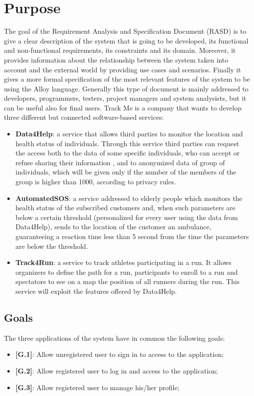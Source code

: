 \section{Purpose}
The  goal of the Requirement Analysis and Specification Document (RASD) is to give a clear description of the system that is going to be developed, its functional and non-functional requirements, its constraints and its domain. Moreover, it provides information about the relationship between the system taken into account and the external world by providing use cases and scenarios. Finally it gives a more formal specification of the most relevant features of the system to be using the Alloy language.
Generally this type of document is mainly addressed to developers, programmers, testers, project managers and system analysists, but it can be useful also for final users.
Track Me is a company that wants to develop three different but connected software-based services:
\begin{itemize}
  \item \textbf{Data4Help}: a service that allows third parties to monitor the location and health status of individuals. Through this service third parties can request the access both to the data of some specific individuals, who can accept or refuse sharing their information , and to anonymized data of group of individuals, which will be given only if the number of the members of the group is higher than 1000, according to privacy rules.
  \item \textbf{AutomatedSOS}: a service addressed to elderly people which monitors the health status of the subscribed customers and, when such parameters are below a certain threshold (personalized for every user using the data from Data4Help), sends to the location of the customer an ambulance, guaranteeing a reaction time less than 5 second from the time the parameters are below the threshold.
  \item \textbf{Track4Run}: a service to track athletes participating in a run. It allows organizers to define the path for a run, participants to enroll to a run and spectators to see on a map the position of all runners during the run. This service will exploit the features offered by Data4Help.
\end{itemize}

\subsection{Goals}
The three applications of the system have in common the following goals:
\begin{itemize}
  \item \textbf{[G.1]}: Allow unregistered user to sign in to access to the application;
  \item \textbf{[G.2]}: Allow registered user to log in and access to the application;
  \item \textbf{[G.3]}: Allow registered user to manage his/her profile;
\end{itemize}

